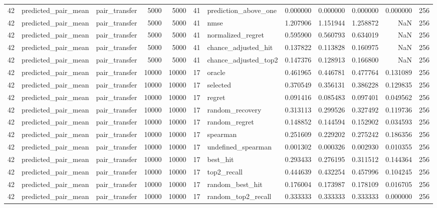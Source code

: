 \begin{tabular}{rllrrrlrrrrr}
42 & predicted_pair_mean & pair_transfer & 5000 & 5000 & 41 & prediction_above_one & 0.000000 & 0.000000 & 0.000000 & 0.000000 & 256 \\
42 & predicted_pair_mean & pair_transfer & 5000 & 5000 & 41 & nmse & 1.207906 & 1.151944 & 1.258872 & NaN & 256 \\
42 & predicted_pair_mean & pair_transfer & 5000 & 5000 & 41 & normalized_regret & 0.595900 & 0.560793 & 0.634019 & NaN & 256 \\
42 & predicted_pair_mean & pair_transfer & 5000 & 5000 & 41 & chance_adjusted_hit & 0.137822 & 0.113828 & 0.160975 & NaN & 256 \\
42 & predicted_pair_mean & pair_transfer & 5000 & 5000 & 41 & chance_adjusted_top2 & 0.147376 & 0.128913 & 0.166800 & NaN & 256 \\
42 & predicted_pair_mean & pair_transfer & 10000 & 10000 & 17 & oracle & 0.461965 & 0.446781 & 0.477764 & 0.131089 & 256 \\
42 & predicted_pair_mean & pair_transfer & 10000 & 10000 & 17 & selected & 0.370549 & 0.356131 & 0.386228 & 0.129835 & 256 \\
42 & predicted_pair_mean & pair_transfer & 10000 & 10000 & 17 & regret & 0.091416 & 0.085483 & 0.097401 & 0.049562 & 256 \\
42 & predicted_pair_mean & pair_transfer & 10000 & 10000 & 17 & random_recovery & 0.313113 & 0.299526 & 0.327492 & 0.119736 & 256 \\
42 & predicted_pair_mean & pair_transfer & 10000 & 10000 & 17 & random_regret & 0.148852 & 0.144594 & 0.152902 & 0.034593 & 256 \\
42 & predicted_pair_mean & pair_transfer & 10000 & 10000 & 17 & spearman & 0.251609 & 0.229202 & 0.275242 & 0.186356 & 256 \\
42 & predicted_pair_mean & pair_transfer & 10000 & 10000 & 17 & undefined_spearman & 0.001302 & 0.000326 & 0.002930 & 0.010355 & 256 \\
42 & predicted_pair_mean & pair_transfer & 10000 & 10000 & 17 & best_hit & 0.293433 & 0.276195 & 0.311512 & 0.144364 & 256 \\
42 & predicted_pair_mean & pair_transfer & 10000 & 10000 & 17 & top2_recall & 0.444639 & 0.432254 & 0.457996 & 0.104245 & 256 \\
42 & predicted_pair_mean & pair_transfer & 10000 & 10000 & 17 & random_best_hit & 0.176004 & 0.173987 & 0.178109 & 0.016705 & 256 \\
42 & predicted_pair_mean & pair_transfer & 10000 & 10000 & 17 & random_top2_recall & 0.333333 & 0.333333 & 0.333333 & 0.000000 & 256 \\

\end{tabular}
